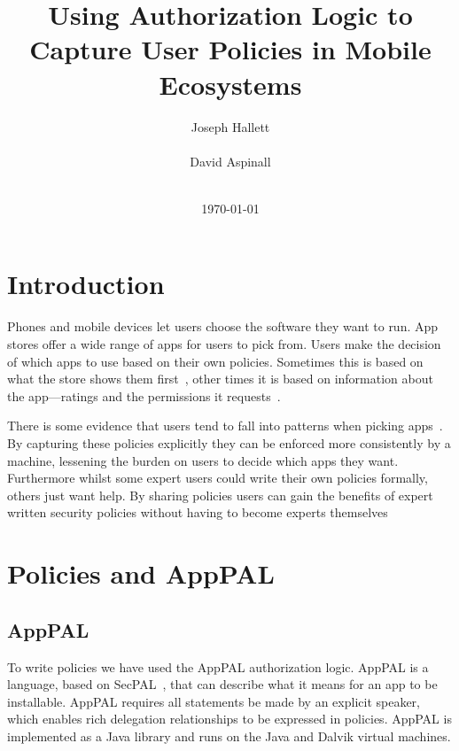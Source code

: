 \documentclass[twocolumn,letterpaper]{soups-poster}
\newcommand{\citep}[1]{\cite{#1}}
\begin{document}
\title{Using Authorization Logic to Capture User Policies in Mobile Ecosystems}
\author{%
  \alignauthor{}
  Joseph Hallett\\
  \\
  \alignauthor{}
  David Aspinall\\
  \\
}
\date\today
\maketitle

\section{Introduction}

Phones and mobile devices let users choose the software they want to run.
App stores offer a wide range of apps for users to pick from.
Users make the decision of which apps to use based on their own policies.
Sometimes this is based on what the store shows them first~\citep{Prata:2012in},
other times it is based on information about the app---ratings and the
permissions it requests~\citep{Kelley:2013kc}.

There is some evidence that users tend to fall into patterns when picking
apps~\citep{Sadeh:2014vq}.  By capturing these policies explicitly they can be
enforced more consistently by a machine, lessening the burden on users to decide
which apps they want.
Furthermore whilst some expert users could write their own policies formally, others
just want help.  By sharing policies users can gain the benefits of expert
written security policies without having to become experts themselves

\section{Policies and AppPAL}

\subsection{AppPAL}

To write policies we have used the AppPAL authorization logic.
AppPAL is a language, based on SecPAL~\citep{Becker:2006vh}, that can describe
what it means for an app to be installable. AppPAL requires all statements be
made by an explicit speaker, which enables rich delegation relationships to be
expressed in policies.
AppPAL is implemented as a Java library and runs on the Java and Dalvik virtual
machines.
\end{document}
